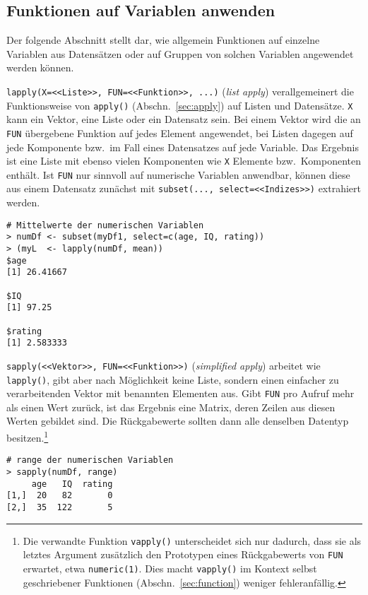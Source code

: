 \subsection{Funktionen auf Variablen anwenden}
\label{sec:sapply}

Der folgende Abschnitt stellt dar, wie allgemein Funktionen auf einzelne Variablen aus Datensätzen oder auf Gruppen von solchen Variablen angewendet werden können.

\lstinline!lapply(X=<<Liste>>, FUN=<<Funktion>>, ...)! (\emph{list apply}) verallgemeinert die Funktionsweise von \lstinline!apply()! (Abschn.\ \ref{sec:apply}) auf Listen und Datensätze. \lstinline!X! kann ein Vektor, eine Liste oder ein Datensatz sein. Bei einem Vektor wird die an \lstinline!FUN! übergebene Funktion auf jedes Element angewendet, bei Listen dagegen auf jede Komponente bzw.\ im Fall eines Datensatzes auf jede Variable. Das Ergebnis ist eine Liste mit ebenso vielen Komponenten wie \lstinline!X! Elemente bzw.\ Komponenten enthält. Ist \lstinline!FUN! nur sinnvoll auf numerische Variablen anwendbar, können diese aus einem Datensatz zunächst mit \lstinline!subset(..., select=<<Indizes>>)! extrahiert werden.
\begin{lstlisting}
# Mittelwerte der numerischen Variablen
> numDf <- subset(myDf1, select=c(age, IQ, rating))
> (myL  <- lapply(numDf, mean))
$age
[1] 26.41667

$IQ
[1] 97.25

$rating
[1] 2.583333
\end{lstlisting}

\lstinline!sapply(<<Vektor>>, FUN=<<Funktion>>)! (\emph{simplified apply}) arbeitet wie \lstinline!lapply()!, gibt aber nach Möglichkeit keine Liste, sondern einen einfacher zu verarbeitenden Vektor mit benannten Elementen aus. Gibt \lstinline!FUN! pro Aufruf mehr als einen Wert zurück, ist das Ergebnis eine Matrix, deren Zeilen aus diesen Werten gebildet sind. Die Rückgabewerte sollten dann alle denselben Datentyp besitzen.\footnote{Die verwandte Funktion \lstinline!vapply()! unterscheidet sich nur dadurch, dass sie als letztes Argument zusätzlich den Prototypen eines Rückgabewerts von \lstinline!FUN! erwartet, etwa \lstinline!numeric(1)!. Dies macht \lstinline!vapply()! im Kontext selbst geschriebener Funktionen (Abschn.\ \ref{sec:function}) weniger fehleranfällig.}
\begin{lstlisting}
# range der numerischen Variablen
> sapply(numDf, range)
     age   IQ  rating
[1,]  20   82       0
[2,]  35  122       5
\end{lstlisting}

